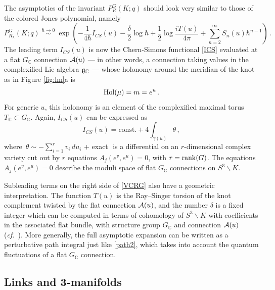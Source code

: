 \documentclass[letterpaper,12pt]{article}
\numberwithin{equation}{section}
\newcommand{\cf}{\emph{cf.}}
\newcommand{\be}{\begin{equation}}
\newcommand{\ee}{\end{equation}}
\newcommand{\bs}{\backslash}
\newcommand{\C}{{\mathbb{C}}}
\newcommand{\fg}{{\frak{g}}}
\newcommand{\rank}{{\rm rank}}
\newcommand{\Hol}{{\rm Hol}}
\newcommand{\CA}{{\cal A}}
\renewcommand{\=}{\;=\;}
\begin{document}
The asymptotics of the invariant $P^G_{R}(K;q)$ should look very similar to those of the colored Jones polynomial, namely
%
\be \boxed{ P^G_{R_\lambda}(K;q) \;\overset{\hbar\to 0}{\sim}\; \exp\left( -\frac{1}{4\hbar}I_{CS}(u)-\frac{\delta}{2}\log\hbar+\frac12\log \frac{iT(u)}{4\pi}+\sum_{n=2}^\infty S_n(u)\hbar^{n-1} \right) } \,. \label{VCRG}
\ee
%
The leading term $I_{CS}(u)$ is now the Chern-Simons functional \eqref{ICS} evaluated at a flat $G_\C$ connection $\CA(u)$ --- in other words, a connection taking values in the complexified Lie algebra $\fg_\C$ --- whose holonomy around the meridian of the knot as in Figure \ref{fig:lm}a is
%
\be \Hol(\mu) = m=e^u\,. \ee
%
For generic $u$, this holonomy is an element of the complexified maximal torus $T_\C \subset G_\C$. Again, $I_{CS}(u)$ can be expressed as
%
\be I_{CS}(u) = \text{const.} + 4\int_{\gamma(u)} \theta\,, \ee
%
where\, $\theta \sim -\sum_{i=1}^r v_i\,du_i$ + exact \,\,is a differential on an $r$-dimensional complex variety cut out by $r$ equations $A_j(e^{v},e^{u})=0$, with $r=\rank(G)$. The equations $A_j(e^{v},e^{u})=0$ describe the moduli space of flat $G_\C$ connections on $S^3\bs K$.

Subleading terms on the right side of \eqref{VCRG} also have a geometric interpretation.
The function $T(u)$ is the Ray--Singer torsion of the knot complement twisted
by the flat connection $\CA(u)$,
and the number $\delta$ is a fixed integer which can be computed in terms of
cohomology of $S^3\bs K$ with coefficients in the associated flat bundle,
with structure group $G_\C$ and connection $\CA(u)$ (\cf\ \cite{barnatan-1991w, DGLZ}).
More generally, the full asymptotic expansion can be written as a perturbative path integral
just like \eqref{path2}, which takes into account the quantum fluctuations of a flat $G_\C$ connection.


\subsection{Links and 3-manifolds}
\label{sec:links}
\end{document}
